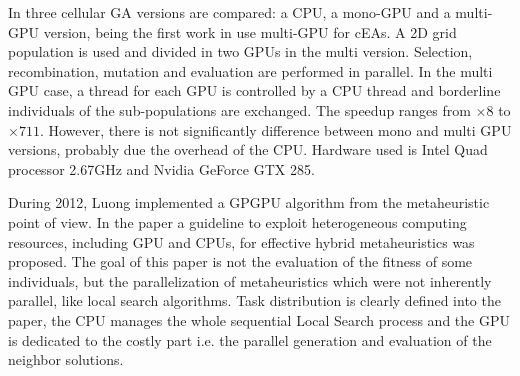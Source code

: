 \documentclass{article}
\begin{document}

In \cite{5586530} three cellular GA versions are compared: a CPU, a mono-GPU and a multi-GPU version, being the first work in use multi-GPU for cEAs. A 2D grid population is used and divided in two GPUs in the multi version. Selection, recombination, mutation and evaluation are performed in parallel. In the multi GPU case, a thread for each GPU is controlled by a CPU thread and borderline individuals of the sub-populations are exchanged. The speedup ranges from $\times8$ to $\times711$. However, there is not significantly difference between mono and multi GPU versions, probably due the overhead of the CPU. Hardware used is Intel Quad processor 2.67GHz and Nvidia GeForce GTX 285.

During 2012, Luong \cite{luongMetaheuristicsPpsn2012} implemented a GPGPU algorithm from the metaheuristic point of view. In the paper a guideline to exploit heterogeneous computing resources, including GPU and CPUs, for effective hybrid metaheuristics was proposed. The goal of this paper is not the evaluation of the fitness of some individuals, but the parallelization of metaheuristics which were not inherently parallel, like local search algorithms. Task distribution is clearly defined into the paper, the CPU manages the whole sequential Local Search process and the GPU is dedicated to the costly part i.e. the parallel generation and evaluation of the neighbor solutions.
\end{document}
